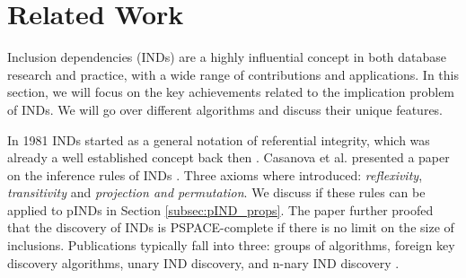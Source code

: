 \section{Related Work}\label{sec:rel_work}

Inclusion dependencies (INDs) are a highly influential concept in both database research and practice, with a wide range of contributions and applications. In this section, we will focus on the key achievements related to the implication problem of INDs. We will go over different algorithms and discuss their unique features.

In 1981 INDs started as a general notation of referential integrity, which was already a well established concept back then \cite{date1981referential}. Casanova et al. presented a paper on the inference rules of INDs \cite{casanova1982inclusion}. Three axioms where introduced: \textit{reflexivity}, \textit{transitivity} and \textit{projection and permutation}. We discuss if these rules can be applied to pINDs in Section \ref{subsec:pIND_props}. The paper further proofed that the discovery of INDs is PSPACE-complete if there is no limit on the size of inclusions. Publications typically fall into three: groups of algorithms, foreign key discovery algorithms, unary IND discovery, and n-nary IND discovery \cite{papenbrock2017data}.
